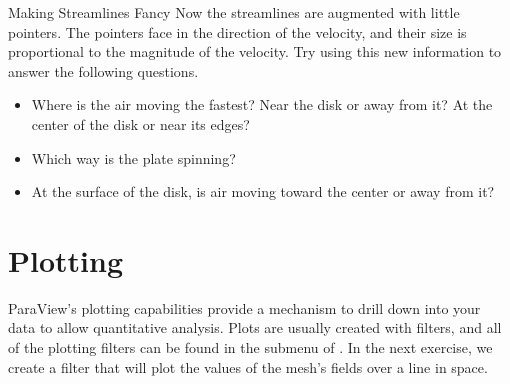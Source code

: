 \begin{exercise}{Making Streamlines Fancy}
  Now the streamlines are augmented with little pointers.  The pointers
  face in the direction of the velocity, and their size is proportional to
  the magnitude of the velocity.  Try using this new information to answer
  the following questions.

  \begin{itemize}
  \item Where is the air moving the fastest?  Near the disk or away from it?
    At the center of the disk or near its edges?
  \item Which way is the plate spinning?
  \item At the surface of the disk, is air moving toward the center or away
    from it?
  \end{itemize}
\end{exercise}


\section{Plotting}

ParaView's plotting capabilities provide a mechanism to drill down into
your data to allow quantitative analysis.  Plots are usually created with
filters, and all of the plotting filters can be found in the  submenu of .  In the next exercise, we create a
filter that will plot the values of the mesh's fields over a line in space.

